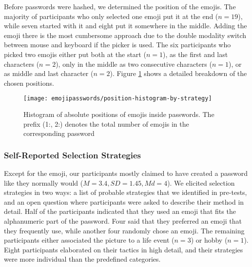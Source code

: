 Before passwords were hashed, we determined the position of the emojis. The majority of participants who only selected one emoji put it at the end ($n=19$), while seven started with it and eight put it somewhere in the middle. Adding the emoji there is the most cumbersome approach due to the double modality switch between mouse and keyboard if the picker is used. The six participants who picked two emojis either put both at the start ($n=1$), as the first and last characters ($n=2$), only in the middle as two consecutive characters ($n=1$), or as middle and last character ($n=2$). Figure \ref{fig:emojipasswords:position-histogram-by-strategy} shows a detailed breakdown of the chosen positions.
\begin{figure}
	\centering
	\texttt{[image: emojipasswords/position-histogram-by-strategy]}
	\caption{\label{fig:emojipasswords:position-histogram-by-strategy} Histogram of absolute positions of emojis inside passwords. The prefix (1:, 2:) denotes the total number of emojis in the corresponding password}
\end{figure}


\subsubsection{Self-Reported Selection Strategies}
Except for the emoji, our participants mostly claimed to have created a password like they normally would ($M=3.4, SD=1.45, Md=4$). 
We elicited selection strategies in two ways: a list of probable strategies that we identified in pre-tests, and an open question where participants were asked to describe their method in detail. Half of the participants indicated that they used an emoji that fits the alphanumeric part of the password. Four said that they preferred an emoji that they frequently use, while another four randomly chose an emoji. The remaining participants either associated the picture to a life event ($n=3$) or hobby ($n=1$). Eight participants elaborated on their tactics in high detail, and their strategies were more individual than the predefined categories. 

